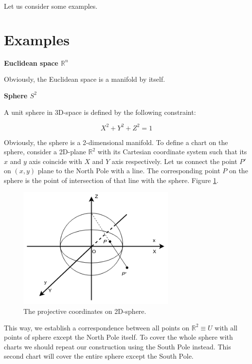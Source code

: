 \documentclass[a4paper,10pt]{article}
\begin{document}
Let us consider some examples.

\section{Examples}


{\bf Euclidean space $\mathbb{R}^n$}
\newline

Obviously, the Euclidean space is a manifold by itself. 
\newline

{\bf Sphere $S^2$}
\newline

A unit sphere in 3D-space is defined by the following constraint:

\begin{equation}
 X^2 + Y^2 + Z^2 = 1
\end{equation}

Obviously, the sphere is a 2-dimensional manifold. To define a chart on the sphere, consider a 2D-plane $\mathbb{R}^2$ with its Cartesian coordinate system such that its $x$ and $y$ axis coincide with $X$ and $Y$ axis respectively. Let us connect the point $P'$ on $(x,y)$ plane to the North Pole with a line. The corresponding point $P$ on the sphere is the point of intersection of that line with the sphere.  Figure \ref{fig:riemann}.

\begin{figure}[h]
\centering
 \includegraphics[width=0.7\textwidth]{../../images/Sphere.png}
 \caption{The projective coordinates on 2D-sphere.  }
 \label{fig:riemann}
\end{figure}

This way, we establish a correspondence between all points on $\mathbb{R}^2 \equiv U$ with all points of sphere except the North Pole itself. To cover the whole sphere with  charts we should repeat our construction using the South Pole instead. This second chart will cover the entire sphere except the South Pole. 
\end{document}
